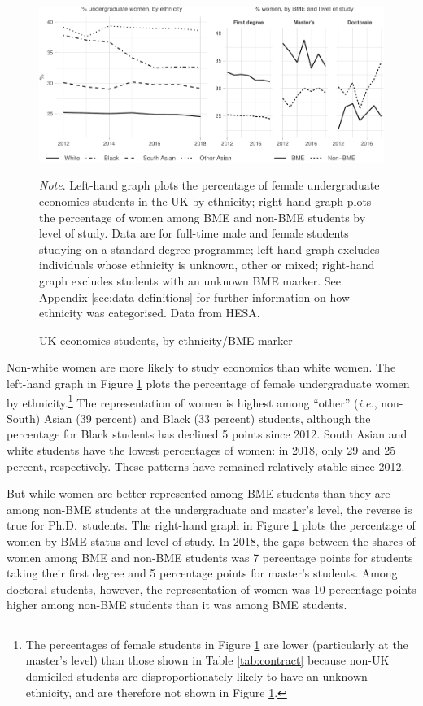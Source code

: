 \documentclass[a4paper, 1]{article}
\begin{document}
\begin{figure}
\centering
\includegraphics[width=\linewidth]{0-images/bme-1.pdf}

\caption{UK economics students, by ethnicity/BME marker}
\label{fig:bme}
\justify\footnotesize\textit{Note}.  Left-hand graph plots the percentage of female undergraduate economics students in the UK by ethnicity; right-hand graph plots the percentage of women among BME and non-BME students by level of study. Data are for full-time male and female students studying on a standard degree programme; left-hand graph excludes individuals whose ethnicity is unknown, other or mixed; right-hand graph excludes students with an unknown BME marker. See Appendix \ref{sec:data-definitions} for further information on how ethnicity was categorised. Data from HESA.
\end{figure}



Non-white women are more likely to study economics than white women. The left-hand graph in Figure \ref{fig:bme} plots the percentage of female undergraduate women by ethnicity.\footnote{The percentages of female students in Figure \ref{fig:bme} are lower (particularly at the master's level) than those shown in Table \ref{tab:contract} because non-UK domiciled students are disproportionately likely to have an unknown ethnicity, and are therefore not shown in Figure \ref{fig:bme}.} The representation of women is highest among ``other'' (\emph{i.e.}, non-South) Asian (39 percent) and Black (33 percent) students, although the percentage for Black students has declined 5 points since 2012. South Asian and white students have the lowest percentages of women: in 2018, only 29 and 25 percent, respectively. These patterns have remained relatively stable since 2012.

But while women are better represented among BME students than they are among non-BME students at the undergraduate and master's level, the reverse is true for Ph.D.~students. The right-hand graph in Figure \ref{fig:bme} plots the percentage of women by BME status and level of study. In 2018, the gaps between the shares of women among BME and non-BME students was 7 percentage points for students taking their first degree and 5 percentage points for master's students. Among doctoral students, however, the representation of women was 10 percentage points higher among non-BME students than it was among BME students.
\end{document}
